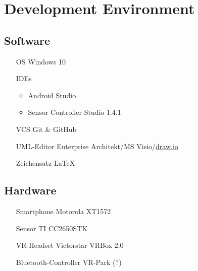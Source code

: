 \section{Development Environment}

\subsection{Software}

\begin{itemize}
  \item[OS] Windows 10
  \item[IDEs]
    \begin{itemize}
      \item Android Studio
      \item Sensor Controller Studio 1.4.1
    \end{itemize}
  \item[VCS] Git \& GitHub
  \item[UML-Editor] Enterprise Architekt/MS Visio/\href{draw.io}{draw.io}
  \item[Zeichensatz] \LaTeX

\end{itemize}

\subsection{Hardware}

\begin{itemize}
  \item[Smartphone] Motorola XT1572
  \item[Sensor] TI CC2650STK
  \item[VR-Headset] Victorstar VRBox 2.0
  \item[Bluetooth-Controller] VR-Park (?)
\end{itemize}
